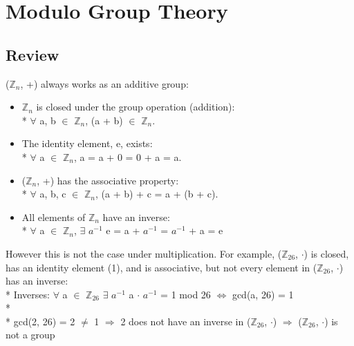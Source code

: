 \documentclass[11pt]{article}
\begin{document}
\section{Modulo Group Theory}
\subsection{Review}
($\mathbb{Z}_{n}$, +) always works as an additive group:

\begin{itemize}
\item $\mathbb{Z}_{n}$ is closed under the group operation (addition):\\*
$\forall$ a, b $\in$ $\mathbb{Z}_{n}$, (a + b) $\in$
$\mathbb{Z}_{n}$.

\item The identity element, e, exists:\\* 
$\forall$ a $\in$ $\mathbb{Z}_{n}$, a = a + 0 = 0 + a = a.

\item ($\mathbb{Z}_{n}$, +) has the associative property:\\*
$\forall$ a, b, c $\in$ $\mathbb{Z}_{n}$, (a + b) + c = a + (b + c).

\item All elements of $\mathbb{Z}_{n}$ have an inverse:\\*
$\forall$ a $\in$ $\mathbb{Z}_{n}$, $\exists$ $a^{-1}$  e =
a + $a^{-1}$ = $a^{-1}$ + a = e
\end{itemize}

\noindent However this is not the case under multiplication.
For example, ($\mathbb{Z}_{26}$, $\cdot$) is closed, has an identity element
(1), and is associative, but not every element in ($\mathbb{Z}_{26}$, $\cdot$) 
has an inverse:\\*
\indent Inverses: $\forall$ a $\in$ $\mathbb{Z}_{26}$ $\exists$ $a^{-1}$
 a $\cdot$ $a^{-1}$ = 1 mod 26 $\Longleftrightarrow$ gcd(a,
26) = 1\\*\\* \indent gcd(2, 26) = 2 $\ne$ 1 $\Longrightarrow$ 2 does not have an inverse in
($\mathbb{Z}_{26}$, $\cdot$) $\Longrightarrow$ ($\mathbb{Z}_{26}$, $\cdot$) is not a
group
\end{document}
